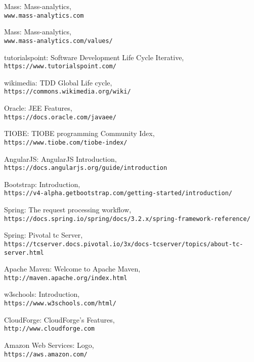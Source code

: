 \begin{thebibliography}{9}

	Mass: Mass-analytics,
	\\\texttt{www.mass-analytics.com}
	
	Mass: Mass-analytics,
	\\\texttt{www.mass-analytics.com/values/}

	
	tutorialspoint: Software Development Life Cycle Iterative,
	\\\texttt{https://www.tutorialspoint.com/}
	
	wikimedia: TDD Global Life cycle,
	\\\texttt{https://commons.wikimedia.org/wiki/}
	
	
	Oracle: JEE Features,
	\\\texttt{https://docs.oracle.com/javaee/}
	
	
	TIOBE: TIOBE programming Community Idex,
	\\\texttt{https://www.tiobe.com/tiobe-index/}
	
	AngularJS: AngularJS Introduction,
	\\\texttt{https://docs.angularjs.org/guide/introduction}
	
	Bootstrap: Introduction,
	\\\texttt{https://v4-alpha.getbootstrap.com/getting-started/introduction/}
	
	Spring: The request processing workflow,
	\\\texttt{https://docs.spring.io/spring/docs/3.2.x/spring-framework-reference/}
	
	Spring: Pivotal tc Server,
	\\\texttt{https://tcserver.docs.pivotal.io/3x/docs-tcserver/topics/about-tc-server.html}
	
	Apache Maven: Welcome to Apache Maven,
	\\\texttt{http://maven.apache.org/index.html}
	
	w3schools: Introduction,
	\\\texttt{https://www.w3schools.com/html/}
		
	CloudForge: CloudForge’s Features,
	\\\texttt{http://www.cloudforge.com}
	
	Amazon Web Services: Logo,
	\\\texttt{https://aws.amazon.com/}
	
	
\end{thebibliography}
